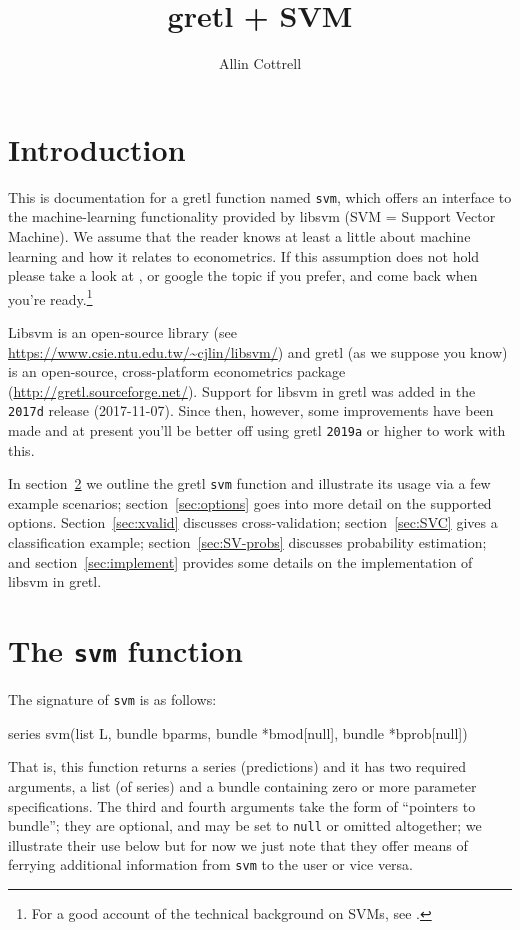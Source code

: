 \documentclass{article}
\begin{document}
\setlength{\parindent}{0pt}
\setlength{\parskip}{1ex}
\setcounter{secnumdepth}{2}

\title{gretl + SVM}
\author{Allin Cottrell}
\maketitle

\section{Introduction}
\label{sec:intro}

This is documentation for a gretl function named \texttt{svm}, which
offers an interface to the machine-learning functionality provided by
\textsf{libsvm} (SVM = Support Vector Machine). We assume that the
reader knows at least a little about machine learning and how it
relates to econometrics. If this assumption does not hold please take
a look at \cite{mull-spiess17}, or google the topic if you prefer, and
come back when you're ready.\footnote{For a good account of the
  technical background on SVMs, see \cite{smola04}.}

\textsf{Libsvm} is an open-source library (see
\url{https://www.csie.ntu.edu.tw/~cjlin/libsvm/}) and gretl (as we
suppose you know) is an open-source, cross-platform econometrics
package (\url{http://gretl.sourceforge.net/}). Support for
\textsf{libsvm} in gretl was added in the \texttt{2017d} release
(2017-11-07). Since then, however, some improvements have been made
and at present you'll be better off using gretl \texttt{2019a} or
higher to work with this.

In section~\ref{sec:function} we outline the gretl \texttt{svm}
function and illustrate its usage via a few example scenarios;
section~\ref{sec:options} goes into more detail on the supported
options. Section~\ref{sec:xvalid} discusses cross-validation;
section~\ref{sec:SVC} gives a classification example;
section~\ref{sec:SV-probs} discusses probability estimation; and
section~\ref{sec:implement} provides some details on the
implementation of \textsf{libsvm} in gretl.

\section{The \texttt{svm} function}
\label{sec:function}

The signature of \texttt{svm} is as follows:
\begin{code}
series svm(list L, bundle bparms, bundle *bmod[null], bundle *bprob[null])
\end{code}
That is, this function returns a series (predictions) and it has two
required arguments, a list (of series) and a bundle containing zero
or more parameter specifications. The third and fourth arguments take
the form of ``pointers to bundle''; they are optional, and may be set
to \texttt{null} or omitted altogether; we illustrate their use below
but for now we just note that they offer means of ferrying additional
information from \texttt{svm} to the user or vice versa.
\end{document}
